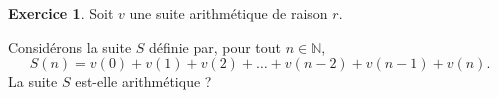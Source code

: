 \documentclass[12pt]{paper}
\theoremstyle{plain}
\theoremstyle{definition}
\newtheorem{ex}{Exercice}
\newcommand{\N}{\mathbb{N}}
\begin{document}
\begin{ex}
	Soit $v$ une suite arithmétique de raison $r$.
	
	Considérons la suite $S$ définie par, pour tout $n\in\N$,
		\[ S(n) = v(0) + v(1) + v(2) + \dots + v(n-2) + v(n-1) + v(n). \]
	La suite $S$ est-elle arithmétique ?
\end{ex}

\end{document}
